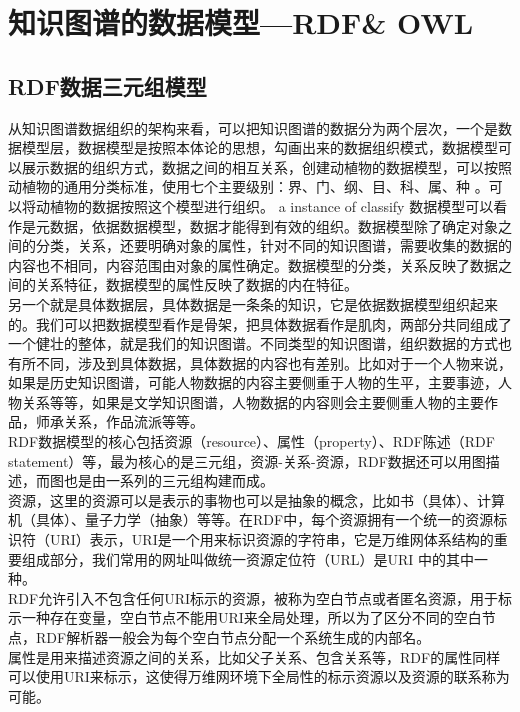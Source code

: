 \chapter{知识图谱的数据模型---RDF\& OWL}\label{sec:RDFIntroduction}
\section{RDF数据三元组模型}\label{sec:RDFModel}
\indent
     从知识图谱数据组织的架构来看，可以把知识图谱的数据分为两个层次，一个是数据模型层，数据模型是按照本体论的思想，勾画出来的数据组织模式，数据模型可以展示数据的组织方式，数据之间的相互关系，创建动植物的数据模型，可以按照动植物的通用分类标准，使用七个主要级别：界、门、纲、目、科、属、种 。可以将动植物的数据按照这个模型进行组织。 a instance of classify 数据模型可以看作是元数据，依据数据模型，数据才能得到有效的组织。数据模型除了确定对象之间的分类，关系，还要明确对象的属性，针对不同的知识图谱，需要收集的数据的内容也不相同，内容范围由对象的属性确定。数据模型的分类，关系反映了数据之间的关系特征，数据模型的属性反映了数据的内在特征。\\
      \indent
     另一个就是具体数据层，具体数据是一条条的知识，它是依据数据模型组织起来的。我们可以把数据模型看作是骨架，把具体数据看作是肌肉，两部分共同组成了一个健壮的整体，就是我们的知识图谱。不同类型的知识图谱，组织数据的方式也有所不同，涉及到具体数据，具体数据的内容也有差别。比如对于一个人物来说，如果是历史知识图谱，可能人物数据的内容主要侧重于人物的生平，主要事迹，人物关系等等，如果是文学知识图谱，人物数据的内容则会主要侧重人物的主要作品，师承关系，作品流派等等。\\
     \indent
     RDF数据模型的核心包括资源（resource）、属性（property）、RDF陈述（RDF statement）等，最为核心的是三元组，资源-关系-资源，RDF数据还可以用图描述，而图也是由一系列的三元组构建而成。\\
     \indent
     资源，这里的资源可以是表示的事物也可以是抽象的概念，比如书（具体）、计算机（具体）、量子力学（抽象）等等。在RDF中，每个资源拥有一个统一的资源标识符（URI）表示，URI是一个用来标识资源的字符串，它是万维网体系结构的重要组成部分，我们常用的网址叫做统一资源定位符（URL）是URI 中的其中一种。\\
     \indent
     RDF允许引入不包含任何URI标示的资源，被称为空白节点或者匿名资源，用于标示一种存在变量，空白节点不能用URI来全局处理，所以为了区分不同的空白节点，RDF解析器一般会为每个空白节点分配一个系统生成的内部名。\\
     \indent
     属性是用来描述资源之间的关系，比如父子关系、包含关系等，RDF的属性同样可以使用URI来标示，这使得万维网环境下全局性的标示资源以及资源的联系称为可能。\\
